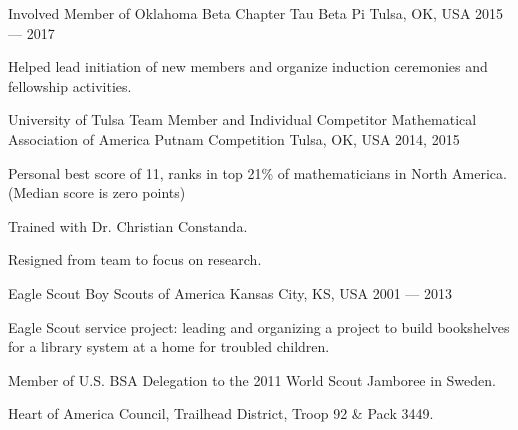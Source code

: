 

\begin{cventries}
	
	\cventry
	{Involved Member of Oklahoma Beta Chapter} %
	{Tau Beta Pi} %
	{Tulsa, OK, USA} %
	{2015 --- 2017} %
	{
		\begin{cvitems} %
			\item {Helped lead initiation of new members and organize induction ceremonies and fellowship activities.}
		\end{cvitems}
	}

  \cventry
    {University of Tulsa Team Member and Individual Competitor} %
    {Mathematical Association of America Putnam Competition} %
    {Tulsa, OK, USA} %
    {2014, 2015} %
    {
      \begin{cvitems} %
        \item {Personal best score of 11, ranks in top 21\% of mathematicians in North America. (Median score is zero points)}
        \item {Trained with Dr. Christian Constanda.}
        \item {Resigned from team to focus on research.}
      \end{cvitems}
    }

\cventry
	{Eagle Scout} %
	{Boy Scouts of America} %
	{Kansas City, KS, USA} %
	{2001 --- 2013} %
	{
		\begin{cvitems} %
			\item {Eagle Scout service project: leading and organizing a project to build bookshelves for a library system at a home for troubled children.}
			\item {Member of U.S. BSA Delegation to the 2011 World Scout Jamboree in Sweden.}
			\item {Heart of America Council, Trailhead District, Troop 92 \& Pack 3449.}
		\end{cvitems}
	}
\end{cventries}

